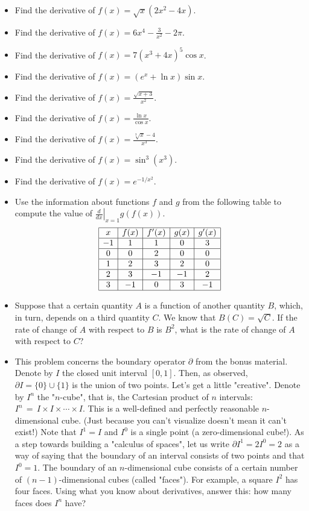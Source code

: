 \documentclass[twoside,openright,titlepage,a4paper]{book}
\begin{document}
\begin{sloppypar}
\begin{itemize}
\item Find the derivative of $f(x)= \sqrt{x}(2x^2-4x)$.
\item Find the derivative of $\displaystyle f(x) = 6x^4 -\frac{3}{x^2}-2\pi$.
\item Find the derivative of $f(x) = 7(x^3+4x)^5 \cos x$.
\item Find the derivative of $f(x) = (e^x + \ln x)\sin x$.
\item Find the derivative of $\displaystyle f(x) = \frac{\sqrt{x+3}}{x^2}$.
\item Find the derivative of $\displaystyle f(x) = \frac{\ln x}{\cos x}$.
\item Find the derivative of $\displaystyle f(x) = \frac{ \sqrt[3]{x} - 4}{x^3}$.
\item Find the derivative of $f(x)=\sin^3 (x^3)$.
\item Find the derivative of $f(x) = e^{-1/x^2}$.
\item Use the information about functions $f$ and $g$ from the following table to compute the value of $\displaystyle \left. \frac{d}{dx} \right|_{x=1}g(f(x))$.
\[
\begin{array}{|c|c|c|c|c|}\hline
x& f(x) & f'(x) & g(x) & g'(x) \\ \hline
-1 & 1 & 1 & 0 & 3 \\ \hline
0 & 0 & 2 & 0 &  0\\ \hline
1 & 2 & 3 & 2 &  0 \\ \hline
2 & 3 & -1 & -1 & 2 \\ \hline
3 & -1 & 0 & 3 & -1 \\ \hline
\end{array}
\]
\item Suppose that a certain quantity $A$ is a function of another quantity $B$, which, in turn, depends on a third quantity $C$. We know that $B(C) = \sqrt{C}$. If the rate of change of $A$ with respect to $B$ is $B^2$, what is the rate of change of $A$ with respect to $C$?
\item This problem concerns the boundary operator $\partial$ from the bonus material. Denote by $I$ the closed unit interval $[0,1]$. Then, as observed, $\partial I = \{0\} \cup \{1\}$ is the union of two points. Let's get a little "creative". Denote by $I^n$ the "$n$-cube", that is, the Cartesian product of $n$ intervals: $I^n \, = \, I \times I \times \cdots \times I$. This is a well-defined and perfectly reasonable $n$-dimensional cube. (Just because you can't visualize doesn't mean it can't exist!) Note that $I^1=I$ and $I^0$ is a single point (a zero-dimensional cube!). As a step towards building a "calculus of spaces", let us write $\partial I^1 = 2I^0 = 2$ as a way of saying that the boundary of an interval consists of two points and that $I^0=1$. The boundary of an $n$-dimensional cube consists of a certain number of $(n-1)$-dimensional cubes (called "faces"). For example, a square $I^2$ has four faces. Using what you know about derivatives, answer this: how many faces does $I^n$ have?
\end{itemize}


\end{sloppypar}
\end{document}

